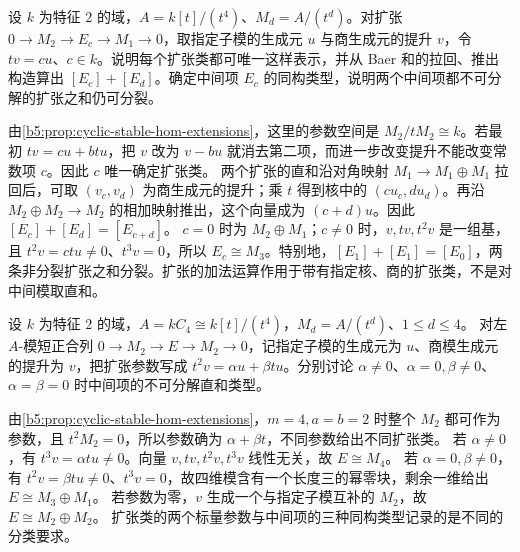 \begin{optionalexercise}\label{b5:ex:08-cyclic-extension-parameters}
	设 \(k\) 为特征 \(2\) 的域，\(A=k[t]/(t^4)\)、\(M_d=A/(t^d)\)。对扩张 \(0\to M_2\to E_c\to M_1\to0\)，取指定子模的生成元 \(u\) 与商生成元的提升 \(v\)，令 \(tv=cu\)、\(c\in k\)。说明每个扩张类都可唯一这样表示，并从 Baer 和的拉回、推出构造算出 \([E_c]+[E_d]\)。确定中间项 \(E_c\) 的同构类型，说明两个中间项都不可分解的扩张之和仍可分裂。
\end{optionalexercise}
\begin{solution}
	由\cref{b5:prop:cyclic-stable-hom-extensions}，这里的参数空间是 \(M_2/tM_2\cong k\)。若最初 \(tv=cu+btu\)，把 \(v\) 改为 \(v-bu\) 就消去第二项，而进一步改变提升不能改变常数项 \(c\)。因此 \(c\) 唯一确定扩张类。 两个扩张的直和沿对角映射 \(M_1\to M_1\oplus M_1\) 拉回后，可取 \((v_c,v_d)\) 为商生成元的提升；乘 \(t\) 得到核中的 \((cu_c,du_d)\)。再沿 \(M_2\oplus M_2\to M_2\) 的相加映射推出，这个向量成为 \((c+d)u\)。因此 \([E_c]+[E_d]=[E_{c+d}]\)。 \(c=0\) 时为 \(M_2\oplus M_1\)；\(c\ne0\) 时，\(v,tv,t^2v\) 是一组基，且 \(t^2v=ctu\ne0\)、\(t^3v=0\)，所以 \(E_c\cong M_3\)。特别地，\([E_1]+[E_1]=[E_0]\)，两条非分裂扩张之和分裂。扩张的加法运算作用于带有指定核、商的扩张类，不是对中间模取直和。
\end{solution}

\begin{optionalexercise}\label{b5:ex:08-c4-extension-middle}
	设 \(k\) 为特征 \(2\) 的域，\(A=kC_4\cong k[t]/(t^4)\)，\(M_d=A/(t^d)\)、\(1\le d\le4\)。 对左 \(A\)-模短正合列 \(0\to M_2\to E\to M_2\to0\)，记指定子模的生成元为 \(u\)、商模生成元的提升为 \(v\)，把扩张参数写成 \(t^2v=\alpha u+\beta tu\)。分别讨论 \(\alpha\neq0\)、\(\alpha=0,\beta\neq0\)、\(\alpha=\beta=0\) 时中间项的不可分解直和类型。
\end{optionalexercise}
\begin{solution}
	由\cref{b5:prop:cyclic-stable-hom-extensions}，\(m=4,a=b=2\) 时整个 \(M_2\) 都可作为参数，且 \(t^2M_2=0\)，所以参数确为 \(\alpha+\beta t\)，不同参数给出不同扩张类。 若 \(\alpha\neq0\)，有 \(t^3v=\alpha tu\neq0\)。向量 \(v,tv,t^2v,t^3v\) 线性无关，故 \(E\cong M_4\)。 若 \(\alpha=0,\beta\neq0\)，有 \(t^2v=\beta tu\neq0\)、\(t^3v=0\)，故四维模含有一个长度三的幂零块，剩余一维给出 \(E\cong M_3\oplus M_1\)。 若参数为零，\(v\) 生成一个与指定子模互补的 \(M_2\)，故 \(E\cong M_2\oplus M_2\)。 扩张类的两个标量参数与中间项的三种同构类型记录的是不同的分类要求。
\end{solution}

